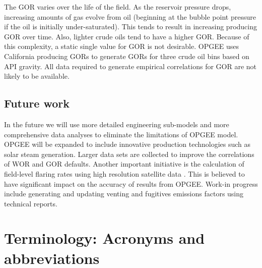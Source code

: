 \documentclass[11pt]{report}
\begin{document}
{{{{The GOR varies over the life of the field. As the reservoir pressure drops, increasing amounts of gas evolve from oil (beginning at the bubble point pressure if the oil is initially under-saturated). This tends to result in increasing producing GOR over time. Also, lighter crude oils tend to have a higher GOR. Because of this complexity, a static single value for GOR is not desirable. OPGEE uses California producing GORs to generate GORs for three crude oil bins based on API gravity. All data required to generate empirical correlations for GOR are not likely to be available.\par




\section{Future work}

In the future we will use more detailed engineering sub-models and more comprehensive data analyses to eliminate the limitations of OPGEE model. OPGEE will be expanded to include innovative production technologies such as solar steam generation. Larger data sets are collected to improve the correlations of WOR and GOR defaults. Another important initiative is the calculation of field-level flaring rates using high resolution satellite data \cite{Elvidge2012ARB}. This is believed to have significant impact on the accuracy of results from OPGEE. Work-in progress include generating and updating venting and fugitives emissions factors using technical reports. 






\appendix


















\chapter{Terminology: Acronyms and abbreviations}

}}}}
\end{document}
